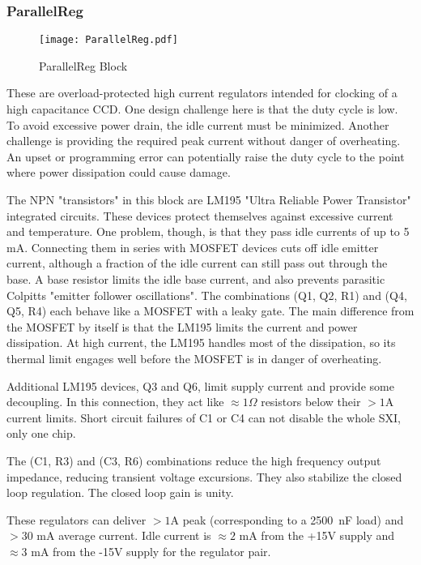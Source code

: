 \documentclass[a4paper,12pt]{article}
\begin{document}
\subsubsection{ParallelReg}
   \begin{figure}
   \begin{center}
   \texttt{[image: ParallelReg.pdf]}
   \end{center}
   \caption{ParallelReg Block}
   \end{figure}

These are overload-protected high current regulators intended for clocking of a high capacitance CCD. One design challenge here is that the duty cycle is low. To avoid excessive power drain, the idle current must be minimized. Another challenge is providing the required peak current without danger of overheating. An upset or programming error can  potentially raise the duty cycle to the point where power dissipation could cause damage.

The NPN "transistors" in this block are LM195 "Ultra Reliable Power Transistor" integrated circuits. These devices protect themselves against excessive current and temperature. One problem, though, is that they pass idle currents of up to 5 mA. Connecting them in series with MOSFET devices cuts off idle emitter current, although a fraction of the idle current can still pass out through the base. A base resistor limits the idle base current, and also prevents parasitic Colpitts "emitter follower oscillations". The combinations (Q1, Q2, R1) and (Q4, Q5, R4) each behave like a MOSFET with a leaky gate. The main difference from the MOSFET by itself is that the LM195 limits the current and power dissipation. At high current, the LM195 handles most of the dissipation, so its thermal limit engages well before the MOSFET  is in danger of overheating.

Additional LM195 devices, Q3 and Q6, limit supply current and provide some decoupling. In this connection, they act like $\approx 1\Omega$ resistors below their $>1$A current limits. Short circuit failures of C1 or C4 can not disable the whole SXI, only one chip.

The (C1, R3) and (C3, R6) combinations reduce the high frequency output impedance, reducing transient voltage excursions. They also stabilize the closed loop regulation. The closed loop gain is unity.

These regulators can deliver $>1$A peak (corresponding to a 2500\ nF load) and $>30$ mA average current. Idle current is  $\approx 2$ mA from the +15V supply and $\approx 3$ mA from the -15V supply for the regulator pair.
\end{document}
